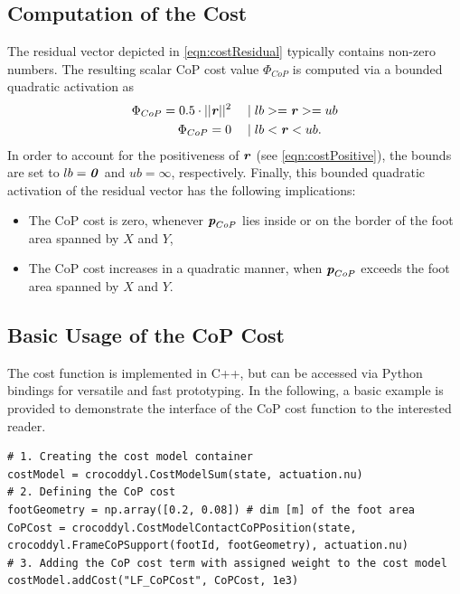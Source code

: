\subsection{Computation of the Cost}
The residual vector depicted in \cref{eqn:costResidual} typically contains non-zero numbers. The resulting scalar \gls{CoP} cost value $\Phi_{CoP}$ is computed via a bounded quadratic activation as
\begin{align}\label{eqn:CoPCostComputation}
\begin{split}
\Phi_{CoP} = 0.5 \cdot ||\bm{\mathit{r}}||^2 \quad &\mid lb >= \bm{\mathit{r}} >= ub \\
\Phi_{CoP} = 0 \quad &\mid lb < \bm{\mathit{r}} < ub.
\end{split}
\end{align}
In order to account for the positiveness of $\bm{\mathit{r}}$ (see \cref{eqn:costPositive}), the bounds are set to $lb=\bm{\mathit{0}}$ and $ub=\infty$, respectively. Finally, this bounded quadratic activation of the residual vector has the following implications:
\begin{itemize}
\item The \gls{CoP} cost is zero, whenever $\bm{\mathit{p}}_{CoP}$ lies inside or on the border of the foot area spanned by $X$ and $Y$,
\item The \gls{CoP} cost increases in a quadratic manner, when $\bm{\mathit{p}}_{CoP}$ exceeds the foot area spanned by $X$ and $Y$.
\end{itemize}  

\subsection{Basic Usage of the CoP Cost}
The cost function is implemented in C++, but can be accessed via Python bindings for versatile and fast prototyping. In the following, a basic example is provided to demonstrate the interface of the \gls{CoP} cost function to the interested reader.
\begin{verbatim}
# 1. Creating the cost model container
costModel = crocoddyl.CostModelSum(state, actuation.nu)
# 2. Defining the CoP cost
footGeometry = np.array([0.2, 0.08]) # dim [m] of the foot area
CoPCost = crocoddyl.CostModelContactCoPPosition(state, 
crocoddyl.FrameCoPSupport(footId, footGeometry), actuation.nu)
# 3. Adding the CoP cost term with assigned weight to the cost model
costModel.addCost("LF_CoPCost", CoPCost, 1e3)
\end{verbatim}

